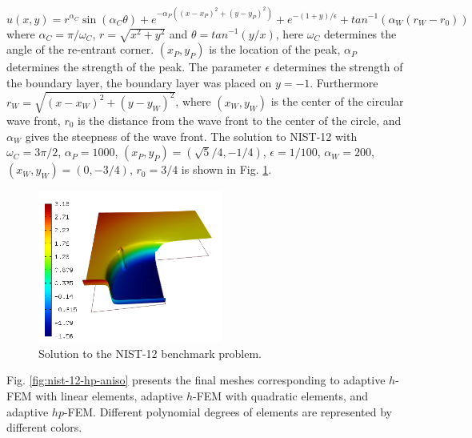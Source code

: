 \documentclass[12pt]{elsarticle}
\begin{document}
\[
u(x,y) =  r^{\alpha_{C} }\sin(\alpha_{C} \theta)
+ e^{-\alpha_{P} ((x - x_{P})^{2} + (y - y_{P})^{2})}
+ e^{-(1 + y) / \epsilon}
+ tan^{-1}(\alpha_{W} (r_{W} - r_{0}))
\]
where $\alpha_C = \pi / \omega_C$, $r = \sqrt{x^2+y^2}$
and $\theta = tan^{-1}(y/x)$, here $\omega_C$ determines
the angle of the re-entrant corner.
$(x_{P}, y_{P})$ is the location of the peak, $\alpha_{P}$
determines the strength of the peak.
The parameter $\epsilon$ determines the
strength of the boundary layer, the boundary layer was placed on $y = -1$.
Furthermore
$r_{W} = \sqrt{(x - x_{W})^{2} + (y - y_{W})^{2}}$,
where $(x_{W}, y_{W})$ is the center of the circular wave front,
$r_{0}$ is the distance from the wave front to the
center of the circle, and $\alpha_W$ gives
the steepness of the wave front.
The solution to NIST-12 with $\omega_C = 3 \pi /2$,
$\alpha_{P} = 1000$, $(x_{P}, y_{P}) = (\sqrt{5} / 4, -1/4)$,
$\epsilon = 1/100$,
$\alpha_{W} = 200$, $(x_{W}, y_{W}) = (0, -3/4)$, $r_{0} = 3/4$
is shown in Fig. \ref{fig:sln-nist12}.

\begin{figure}[H]
\centering
\includegraphics[height=5cm]{nist/nist-12/solution.png}
\vspace{-3mm}
\caption{Solution to the NIST-12 benchmark problem.}
\vspace{-4mm}
\label{fig:sln-nist12}
\end{figure}

Fig. \ref{fig:nist-12-hp-aniso} presents the final meshes corresponding to adaptive $h$-FEM with
linear elements, adaptive $h$-FEM with quadratic elements, and adaptive $hp$-FEM. Different
polynomial degrees of elements are represented by different colors.
\end{document}
